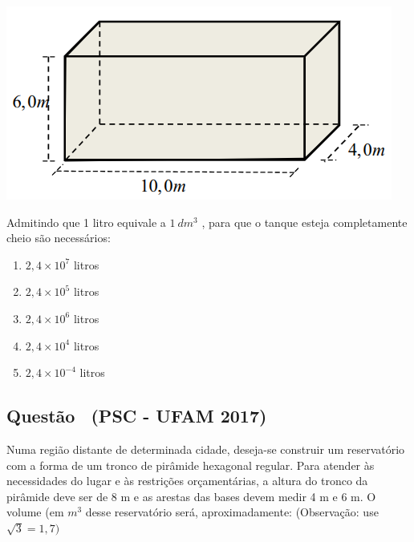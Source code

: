 \documentclass[12pt]{article}
\newif\ifmostravermelho
\newcommand{\vermelho}[1]{%
  \ifmostravermelho
    {\color{red}#1}%
  \else
    #1%
  \fi
}
\newcounter{questao}
\newcommand{\novaquestao}[1]{%
  \stepcounter{questao}%
  \subsection*{Questão \thequestao\ (#1)}%
}
\begin{document}
\begin{multicols}{2}
            \begin{center}
                \includegraphics[scale=0.6]{q4.png}
            \end{center} Admitindo que 1 litro equivale a $1 \ dm^{3}$ , para que o tanque esteja completamente cheio são necessários:
        
            \begin{enumerate}[label=(\Alph*), noitemsep]
                \item $2,4 \times 10^{7}$ litros
                \item \vermelho{$2,4 \times 10^{5}$ litros} %
                \item $2,4 \times 10^{6}$ litros
                \item $2,4 \times 10^{4}$ litros
                \item $2,4 \times 10^{-4}$ litros
            \end{enumerate}
        
        \novaquestao{PSC - UFAM 2017}
            Numa região distante de determinada cidade, deseja-se construir um reservatório com a forma de um tronco de pirâmide hexagonal regular. Para atender às necessidades do lugar e às restrições orçamentárias, a altura do tronco da pirâmide deve ser de 8 m e as arestas das bases devem medir 4 m e 6 m. O volume (em $m^{3}$ desse reservatório será, aproximadamente: (Observação: use $\sqrt{3} = 1,7)$ \\


\end{multicols}
\end{document}
